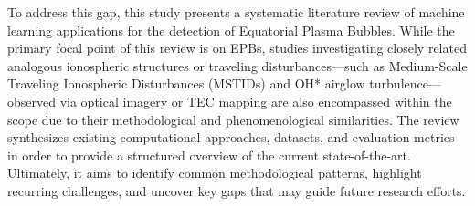 To address this gap, this study presents a systematic literature review
of machine learning applications for the detection of Equatorial Plasma
Bubbles. While the primary focal point of this review is on EPBs,
studies investigating closely related analogous ionospheric structures
or traveling disturbances---such as Medium-Scale Traveling Ionospheric
Disturbances (MSTIDs) and OH* airglow turbulence---observed via optical
imagery or TEC mapping are also encompassed within the scope due to
their methodological and phenomenological similarities. The review
synthesizes existing computational approaches, datasets, and evaluation
metrics in order to provide a structured overview of the current
state-of-the-art. Ultimately, it aims to identify common methodological
patterns, highlight recurring challenges, and uncover key gaps that may
guide future research efforts.
